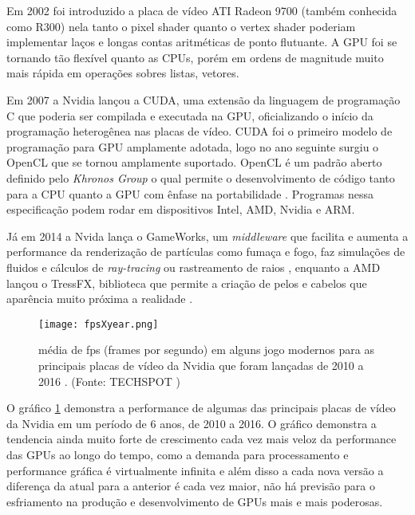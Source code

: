   Em 2002 foi introduzido a placa de vídeo ATI Radeon 9700 (também conhecida como R300)\citep{R300:02} nela tanto o pixel shader quanto o vertex shader poderiam implementar laços e longas contas aritméticas de ponto flutuante. A GPU foi se tornando tão flexível quanto as CPUs, porém em ordens de magnitude muito mais rápida em operações sobres listas, vetores.

  Em 2007 a Nvidia lançou a CUDA, uma extensão da linguagem de programação C que poderia ser compilada e executada na GPU, oficializando o início da programação heterogênea nas placas de vídeo. CUDA foi o primeiro modelo de programação para GPU amplamente adotada, logo no ano seguinte surgiu o OpenCL que se tornou amplamente suportado. OpenCL é um padrão aberto definido pelo \textit{Khronos Group} o qual permite o desenvolvimento de código tanto para a CPU quanto a GPU com ênfase na portabilidade \citep{opencl}. Programas nessa especificação podem rodar em dispositivos Intel, AMD, Nvidia e ARM.


  Já em 2014 a Nvida lança o GameWorks, um \textit{middleware} que facilita e aumenta a performance da renderização de partículas como fumaça e fogo, faz simulações de fluidos e cálculos de \textit{ray-tracing} ou rastreamento de raios \citep{gameworks}, enquanto a AMD lançou o TressFX, biblioteca que permite a criação de pelos e cabelos que aparência muito próxima a realidade \citep{tressfx}.

  \begin{figure}[!h]
    \centering
    \texttt{[image: fpsXyear.png]}
    \caption{média de fps (frames por segundo) em alguns jogo modernos para as principais placas de vídeo da Nvidia que foram lançadas de 2010 a 2016 . (Fonte: TECHSPOT \protect\footnotemark)}
    \label{fig:fpsXyear}
  \end{figure}


  O gráfico \ref{fig:fpsXyear} demonstra a performance de algumas das principais placas de vídeo da Nvidia em um período de 6 anos, de 2010 a 2016. O gráfico demonstra a tendencia ainda muito forte de crescimento cada vez mais veloz da performance das GPUs ao longo do tempo, como a demanda para processamento e performance gráfica é virtualmente infinita e além disso a cada nova versão a diferença da atual para a anterior é cada vez maior, não há previsão para o esfriamento na produção e desenvolvimento de GPUs mais e mais poderosas.

